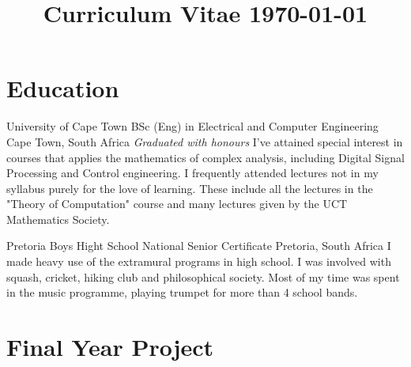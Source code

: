 \documentclass[11pt,a4paper,sans]{moderncv}
\title{Curriculum Vitae \newline\null\hfill\small\today}
\begin{document}
\makecvtitle


\section{Education}

{University of Cape Town}
{BSc (Eng) in Electrical and Computer Engineering}
{\newline Cape Town, South Africa}
{\textit{Graduated with honours}}
{I've attained special interest in courses that applies the mathematics of complex
analysis, including Digital Signal Processing and Control engineering. I
frequently attended lectures not in my syllabus purely for the love of learning.
These include all the lectures in the "Theory of Computation" course and many
lectures given by the UCT Mathematics Society.}

\vspace{2mm}
{Pretoria Boys Hight School}
{National Senior Certificate}
{\newline Pretoria, South Africa}
{}
{I made heavy use of the extramural programs in high school. I was involved with
squash, cricket, hiking club and philosophical society. Most of my time was spent
in the music programme, playing trumpet for more than 4 school bands.}

\section{Final Year Project}
\end{document}
